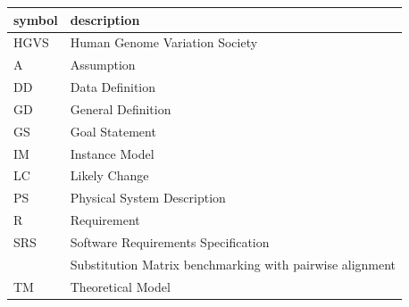 \documentclass[12pt]{article}
\begin{document}
\renewcommand{\arraystretch}{1.2}
\begin{tabular}{l l} 
  \toprule		
  \textbf{symbol} & \textbf{description}\\
  \midrule 
  HGVS & Human Genome Variation Society\\
  A & Assumption\\
  DD & Data Definition\\
  GD & General Definition\\
  GS & Goal Statement\\
  IM & Instance Model\\
  LC & Likely Change\\
  PS & Physical System Description\\
  R & Requirement\\
  SRS & Software Requirements Specification\\
  \progname{} & Substitution Matrix benchmarking with pairwise alignment\\
  TM & Theoretical Model\\
  \bottomrule
\end{tabular}\\







\end{document}
